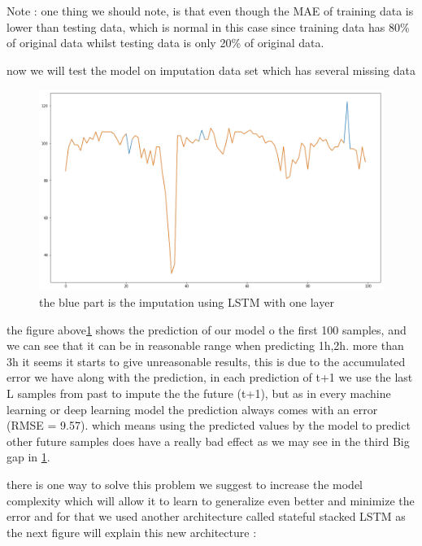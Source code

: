 Note : one thing we should note, is that even though the MAE of training data is lower than testing data, which is normal in this case  since training data has 80\%  of original data whilst testing data is only 20\% of original data.

now we will test the model on imputation data set which has  several missing data 

\begin{figure}[h]
\centering
\includegraphics[scale=.32]{img/merge_best_of_result.png}  
\caption{the blue part is the imputation using  LSTM with one layer}
\label{fig:first_imp}
\end{figure}

the figure above\ref{fig:first_imp} shows the prediction of our model o the first 100 samples, and we can see that it can be in reasonable range when predicting 1h,2h. more than 3h it seems it starts to give unreasonable results, this is due to the accumulated error we have along with the prediction, in each prediction of t+1 we use the last L samples from past to impute the the future (t+1), but as in every machine learning or deep learning model the prediction always comes with an error (RMSE = 9.57). which means using the predicted values by the model to predict other future samples does have a really bad effect as we may see in the third Big gap in \ref{fig:first_imp}.

there is one way to solve this problem we suggest to increase the model complexity which will allow it to learn to generalize even better and minimize the error and for that we used another architecture  called  stateful stacked LSTM as the next figure will explain this new architecture :

